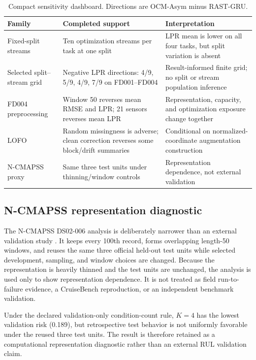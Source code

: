 \documentclass[11pt,a4paper]{article}
\begin{document}
\begin{table}[H]
\centering
\small
\caption{Compact sensitivity dashboard. Directions are OCM-Asym minus RAST-GRU.}
\label{tab:sensitivity-dashboard}
\begin{tabular}{@{}p{}p{}p{}@{}}
\toprule
Family & Completed support & Interpretation \\
\midrule
Fixed-split streams & Ten optimization streams per task at one split & LPR mean is lower on all four tasks, but split variation is absent \\
Selected split--stream grid & Negative LPR directions: 4/9, 5/9, 4/9, 7/9 on FD001--FD004 & Result-informed finite grid; no split or stream population inference \\
FD004 preprocessing & Window 50 reverses mean RMSE and LPR; 21 sensors reverses mean LPR & Representation, capacity, and optimization exposure change together \\
LOFO & Random missingness is adverse; clean correction reverses some block/drift summaries & Conditional on normalized-coordinate augmentation construction \\
N-CMAPSS proxy & Same three test units under thinning/window controls & Representation dependence, not external validation \\
\bottomrule
\end{tabular}
\end{table}

\subsection{N-CMAPSS representation diagnostic}

The N-CMAPSS DS02-006 analysis is deliberately narrower than an external validation study \citep{AriasChao2021NCMAPSS}. It keeps every 100th record, forms overlapping length-50 windows, and reuses the same three official held-out test units while selected development, sampling, and window choices are changed. Because the representation is heavily thinned and the test units are unchanged, the analysis is used only to show representation dependence. It is not treated as field run-to-failure evidence, a CruiseBench reproduction, or an independent benchmark validation.

Under the declared validation-only condition-count rule, $K=4$ has the lowest validation risk (0.189), but retrospective test behavior is not uniformly favorable under the reused three test units. The result is therefore retained as a computational representation diagnostic rather than an external RUL validation claim.
\end{document}
